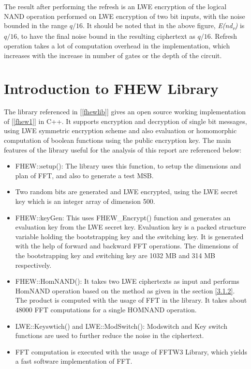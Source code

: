 

\noindent The result after performing the refresh is an LWE encryption of the logical NAND operation performed on LWE encryption of two bit inputs, with the noise bounded in the range $q/16$. It should be noted that in the above figure, \textit{E(nd\textsubscript{r})} is $q/16$, to have the final noise bound in the resulting ciphertext as $q/16$. Refresh operation takes a lot of computation overhead in the implementation, which increases with the increase in number of gates or the depth of the circuit.


\section{Introduction to FHEW Library} \label{3.2}
The library referenced  in [\ref{fhewlib}] gives an open source working implementation of [\ref{fhew1}] in C++. It supports encryption and decryption of single bit messages, using LWE symmetric encryption scheme and also evaluation or homomorphic computation of boolean functions using the public encryption key. The main features of the library useful for the analysis of this report are referenced below:
\begin{itemize}
\item
FHEW::setup(): The library uses this function, to setup the dimensions and plan of FFT, and also to generate a test MSB. 
\item
Two random bits are generated and LWE encrypted, using the LWE secret key which is an integer array of dimension 500.
\item
FHEW::keyGen: This uses FHEW\_Encrypt() function and generates an evaluation key from the LWE secret key. Evaluation key is a packed structure variable holding the bootstrapping key and the switching key. It is generated with the help of forward and backward FFT operations. The dimensions of the bootstrapping key and switching key are 1032 MB and 314 MB respectively.
\item
FHEW::HomNAND(): It takes two LWE ciphertexts as input and performs HomNAND operation based on the method as given in the section \ref{3.1.2}. The product is computed with the usage of FFT in the library. It takes about 48000 FFT computations for a single HOMNAND operation.
\item
LWE::Keyswtich() and  LWE::ModSwitch(): Modswitch and Key switch functions are used to further reduce the noise in the ciphertext.
\item
FFT computation is executed with the usage of FFTW3 Library, which yields a fast software implementation of FFT.
\end{itemize}

